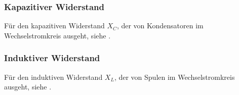 \subsubsection{Kapazitiver Widerstand}

Für den kapazitiven Widerstand $X_C$, der von Kondensatoren im Wechselstromkreis ausgeht, siehe .


\subsubsection{Induktiver Widerstand}

Für den induktiven Widerstand $X_L$, der von Spulen im Wechselstromkreis ausgeht, siehe .






